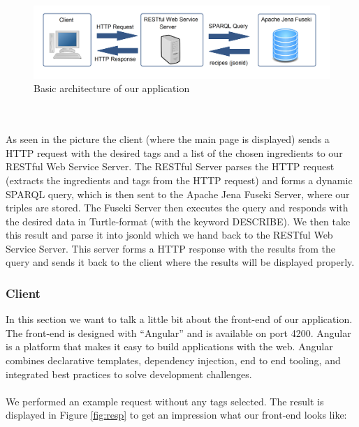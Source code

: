 \documentclass{article}
\begin{document}
\begin{figure}[H]
  \centering
  \includegraphics[width=12cm]{pictures/app.png}
  \caption{Basic architecture of our application}
  \label{fig:arch}
\end{figure}
\noindent
\\ \\
As seen in the picture the client (where the main page is displayed) sends a HTTP request with the desired tags and a list of the chosen ingredients to our RESTful Web Service Server. The RESTful Server parses the HTTP request (extracts the ingredients and tags from the HTTP request) and forms a dynamic SPARQL query, which is then sent to the Apache Jena Fuseki Server, where our triples are stored. The Fuseki Server then executes the query and responds with the desired data in Turtle-format (with the keyword DESCRIBE). We then take this result and parse it into jsonld which we hand back to the RESTful Web Service Server. This server forms a HTTP response with the results from the query and sends it back to the client where the results will be displayed properly.

\subsubsection{Client}
In this section we want to talk a little bit about the front-end of our application. The front-end is designed with ``Angular'' and is available on port 4200. Angular is a platform that makes it easy to build applications with the web. Angular combines declarative templates, dependency injection, end to end tooling, and integrated best practices to solve development challenges.  \\ \\
We performed an example request without any tags selected. The result is displayed in Figure \ref{fig:resp} to get an impression what our front-end looks like:
\end{document}
